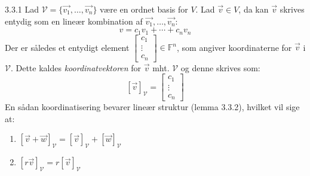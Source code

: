 \begin{definition}{3.3.1}
Lad $\mathcal{V} = \{\vec{v_1}, \dotsc, \vec{v_n}\}$ være en ordnet basis 
	for $V$. Lad $\vec{v} \in V$, da kan $\vec{v}$ skrives entydig som en 
	lineær kombination af $\vec{v_1}, \dotsc, \vec{v_n}$:
	\[
		v = c_1v_1 + \dotsb + c_nv_n
	\]
	Der er således et entydigt element $\begin{bmatrix}c_1\\ \vdots \\ c_n
	\end{bmatrix} \in \mathbb{F}^n$, som angiver koordinaterne for $\vec{v}$ i
	$\mathcal{V}$. Dette kaldes \textit{koordinatvektoren} for $\vec{v}$ mht.
	$\mathcal{V}$ og denne skrives som:
	\[
		[\vec{v}]_\mathcal{V} = \begin{bmatrix}c_1\\ \vdots \\ c_n\end{bmatrix}
	\]
	En sådan koordinatisering bevarer lineær struktur (lemma 3.3.2), hvilket 
	vil sige at:
	\begin{enumerate}[(1)]
		\item $[\vec{v} + \vec{w}]_\mathcal{V} = [\vec{v}]_\mathcal{V} + [\vec{w}]_\mathcal{V}$
		\item $[r\vec{v}]_\mathcal{V} = r [\vec{v}]_\mathcal{V}$
	\end{enumerate}
\end{definition}
